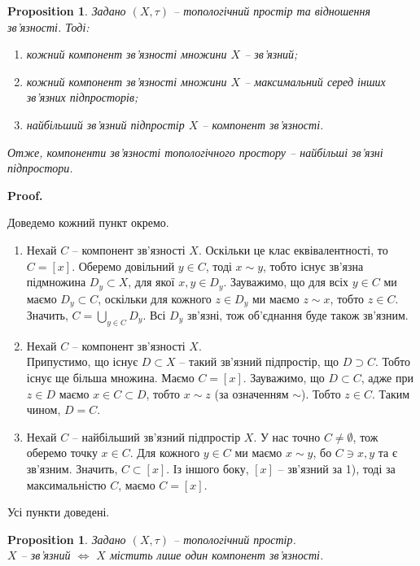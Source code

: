 \documentclass[a4paper, 10pt]{article}
\makeatletter
\theoremstyle{theoremdd}
\newtheorem{proposition}[theorem]{Proposition}
\renewenvironment{proof}[1][Proof.\\]{\par
\pushQED{\hfill \qed}%
\normalfont \topsep6\p@\@plus6\p@\relax
\trivlist
\item\relax
{\bfseries
#1\@addpunct{.}}\hspace\labelsep\ignorespaces
}{%
\popQED\endtrivlist\@endpefalse
}
\makeatother
\begin{document}
\begin{proposition}
Задано $(X,\tau)$ -- топологічний простір та відношення зв'язності. Тоді:
\begin{enumerate}[nosep, wide=0pt, label={\arabic*)}]
\item кожний компонент зв'язності множини $X$ -- зв'язний;
\item кожний компонент зв'язності множини $X$ -- максимальний серед інших зв'язних підпросторів;
\item найбільший зв'язний підпростір $X$ -- компонент зв'язності.
\end{enumerate}
Отже, компоненти зв'язності топологічного простору -- найбільші зв'язні підпростори.
\end{proposition}

\begin{proof}
Доведемо кожний пункт окремо.
\begin{enumerate}[wide=0pt, label={\arabic*)}]
\item Нехай $C$ -- компонент зв'язності $X$. Оскільки це клас еквівалентності, то $C = [x]$. Оберемо довільний $y \in C$, тоді $x \sim y$, тобто існує зв'язна підмножина $D_y \subset X$, для якої $x,y \in D_y$. Зауважимо, що для всіх $y \in C$ ми маємо $D_y \subset C$, оскільки для кожного $z \in D_y$ ми маємо $z \sim x$, тобто $z \in C$. Значить, $C = \displaystyle\bigcup_{y \in C} D_y$. Всі $D_y$ зв'язні, тож об'єднання буде також зв'язним.

\item Нехай $C$ -- компонент зв'язності $X$. \\
Припустимо, що існує $D \subset X$ -- такий зв'язний підпростір, що $D \supset C$. Тобто існує ще більша множина. Маємо $C = [x]$. Зауважимо, що $D \subset C$, адже при $z \in D$ маємо $x \in C \subset D$, тобто $x \sim z$ (за означенням $\sim$). Тобто $z \in C$. Таким чином, $D = C$.

\item Нехай $C$ -- найбільший зв'язний підпростір $X$. У нас точно $C \neq \emptyset$, тож оберемо точку $x \in C$. Для кожного $y \in C$ ми маємо $x \sim y$, бо $C \ni x,y$ та є зв'язним. Значить, $C \subset [x]$. Із іншого боку, $[x]$ -- зв'язний за 1), тоді за максимальністю $C$, маємо $C = [x]$.
\end{enumerate}
Усі пункти доведені.
\end{proof}

\begin{proposition}
Задано $(X,\tau)$ -- топологічний простір.\\
$X$ -- зв'язний $\iff$ $X$ містить лише один компонент зв'язності.
\end{proposition}
\end{document}
